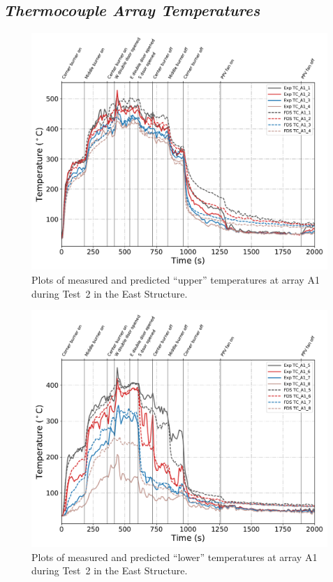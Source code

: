 \clearpage
\subsection*{\textit{Thermocouple Array Temperatures}}

\begin{figure}[!h]
	\centering
	\includegraphics[width=\columnwidth]{Figures/Plots/Validation/Temperature/Test_2_TC_A1_upper}
	\caption{Plots of measured and predicted ``upper'' temperatures at array A1 during Test~2 in the East Structure.}
	\label{fig:TCA1_upper_data_Test2}
\end{figure}
\clearpage
\begin{figure}[!h]
	\centering
	\includegraphics[width=\columnwidth]{Figures/Plots/Validation/Temperature/Test_2_TC_A1_lower}
	\caption{Plots of measured and predicted ``lower'' temperatures at array A1 during Test~2 in the East Structure.}
	\label{fig:TCA1_lower_data_Test2}
\end{figure}

